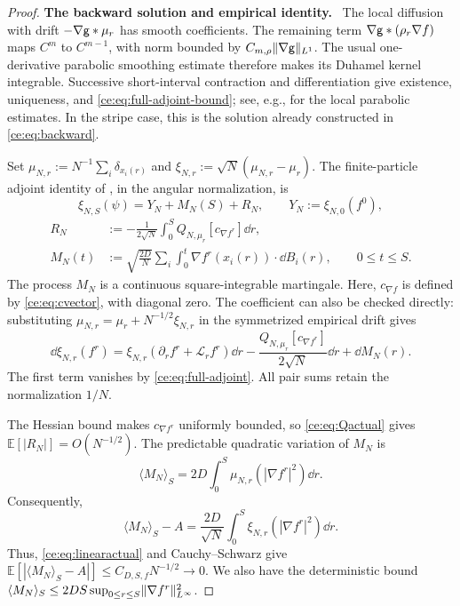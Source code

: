 \documentclass[11pt,reqno]{amsart}
\numberwithin{equation}{section}
\theoremstyle{plain}
\theoremstyle{remark}
\DeclarePairedDelimiter{\norm}{\lVert}{\rVert}
\newcommand{\E}{\mathbb E}\newcommand{\Q}{\mathbb Q}\newcommand{\Pb}{\mathbb P}
\newcommand{\parheading}[1]{\par\medskip\noindent\textbf{#1}\ }
\begin{document}
\begin{proof}
\parheading{The backward solution and empirical identity.}
The local diffusion with drift $-\nabla\mathsf g*\mu_r$ has smooth coefficients. The remaining term $\nabla\mathsf g*(\rho_r\nabla f)$ maps $C^m$ to $C^{m-1}$, with norm bounded by $C_{m,\rho}\|\nabla\mathsf g\|_{L^1}$. The usual one-derivative parabolic smoothing estimate therefore makes its Duhamel kernel integrable. Successive short-interval contraction and differentiation give existence, uniqueness, and \eqref{ce:eq:full-adjoint-bound}; see, e.g., \cite[Chapter~5]{Lunardi} for the local parabolic estimates. In the stripe case, this is the solution already constructed in \eqref{ce:eq:backward}.

Set $\mu_{N,r}:=N^{-1}\sum_i\delta_{x_i(r)}$ and $\xi_{N,r}:=\sqrt N(\mu_{N,r}-\mu_r)$. The finite-particle adjoint identity of \cite[Proposition~8.2]{DGRpartition}, in the angular normalization, is
\begin{equation}\label{ce:eq:exactmart}
 \xi_{N,S}(\psi)=Y_N+M_N(S)+R_N,\qquad Y_N:=\xi_{N,0}(f^0),
\end{equation}
\begin{align}
 R_N&:=-\frac1{2\sqrt N}\int_0^S Q_{N,\mu_r}[c_{\nabla f^r}]\dd r,\label{ce:eq:martremainders}\\
 M_N(t)&:=\sqrt{\frac{2D}{N}}\sum_i\int_0^t\nabla f^r(x_i(r))\cdot\dd B_i(r),\qquad 0\le t\le S.\label{ce:eq:martingale-process}
\end{align}
The process $M_N$ is a continuous square-integrable martingale. Here, $c_{\nabla f}$ is defined by \eqref{ce:eq:cvector}, with diagonal zero. The coefficient can also be checked directly: substituting $\mu_{N,r}=\mu_r+N^{-1/2}\xi_{N,r}$ in the symmetrized empirical drift gives
\begin{equation}\label{ce:eq:empirical-adjoint-differential}
 \dd\xi_{N,r}(f^r)=\xi_{N,r}(\partial_r f^r+\mathcal L_rf^r)\dd r
 -\frac{Q_{N,\mu_r}[c_{\nabla f^r}]}{2\sqrt N}\dd r+\dd M_N(r).
\end{equation}
The first term vanishes by \eqref{ce:eq:full-adjoint}. All pair sums retain the normalization $1/N$.

The Hessian bound makes $c_{\nabla f^r}$ uniformly bounded, so \eqref{ce:eq:Qactual} gives $\E[|R_N|]=O(N^{-1/2})$. The predictable quadratic variation of $M_N$ is
\begin{equation}\label{ce:eq:martbracket}
 \langle M_N\rangle_S=2D\int_0^S\mu_{N,r}(|\nabla f^r|^2)\dd r.
\end{equation}
Consequently,
\begin{equation}\label{ce:eq:bracketdifference}
 \langle M_N\rangle_S-A=\frac{2D}{\sqrt N}\int_0^S\xi_{N,r}(|\nabla f^r|^2)\dd r.
\end{equation}
Thus, \eqref{ce:eq:linearactual} and Cauchy--Schwarz give
$\E[|\langle M_N\rangle_S-A|]\le C_{D,S,f}N^{-1/2}\to0$. We also have the deterministic bound $\langle M_N\rangle_S\le 2DS\sup_{0\le r\le S}\norm{\nabla f^r}_{L^\infty}^2$.


\end{proof}
\end{document}
